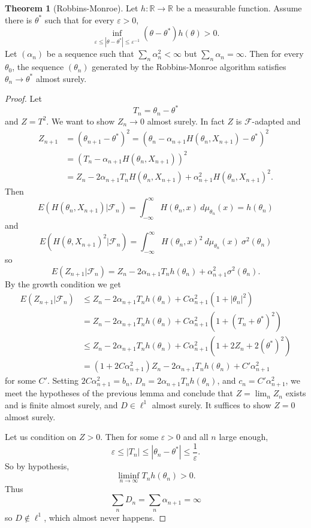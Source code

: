 \documentclass[12pt]{book}
\newcommand{\RR}{\mathbb{R}}
\theoremstyle{definition}
\newtheorem{theorem}{Theorem}[chapter]
\begin{document}
\begin{theorem}[Robbins-Monroe]
Let $h: \RR \to \RR$ be a measurable function.
Assume there is $\theta^*$ such that for every $\varepsilon > 0$,
$$\inf_{\varepsilon \leq |\theta - \theta^*| \leq \varepsilon^{-1}} (\theta - \theta^*)h(\theta) > 0.$$
Let $(\alpha_n)$ be a sequence such that $\sum_n \alpha_n^2 < \infty$ but $\sum_n \alpha_n = \infty$.
Then for every $\theta_0$, the sequence $(\theta_n)$ generated by the Robbins-Monroe algorithm satisfies $\theta_n \to \theta^*$ almost surely.
\end{theorem}
\begin{proof}
Let
$$T_n = \theta_n - \theta^*$$
and $Z = T^2$. We want to show $Z_n \to 0$ almost surely.
In fact $Z$ is $\mathcal F$-adapted and
\begin{align*}
Z_{n+1} &= (\theta_{n+1} - \theta^*)^2 = (\theta_n - \alpha_{n+1}H(\theta_n, X_{n+1}) - \theta^*)^2 \\
&= (T_n - \alpha_{n+1} H(\theta_n, X_{n+1}))^2\\
&= Z_n - 2\alpha_{n+1} T_n H(\theta_n, X_{n+1}) + \alpha_{n+1}^2 H(\theta_n, X_{n+1})^2.
\end{align*}
Then
$$E(H(\theta_n, X_{n+1})|\mathcal F_n) = \int_{-\infty}^\infty H(\theta_n, x) ~d\mu_{\theta_n}(x) = h(\theta_n)$$
and
$$E(H(\theta, X_{n+1})^2|\mathcal F_n) = \int_{-\infty}^\infty H(\theta_n, x)^2 ~d\mu_{\theta_n}(x) ~\sigma^2(\theta_n)$$
so
$$E(Z_{n+1}|\mathcal F_n) = Z_n - 2\alpha_{n+1} T_n h(\theta_n) + \alpha_{n+1}^2 \sigma^2(\theta_n).$$
By the growth condition we get
\begin{align*}
E(Z_{n+1}|\mathcal F_n) &\leq Z_n - 2\alpha_{n+1} T_n h(\theta_n) + C\alpha_{n+1}^2 (1 + |\theta_n|^2)\\
&= Z_n - 2\alpha_{n+1} T_n h(\theta_n) + C\alpha_{n+1}^2(1 + (T_n + \theta^*)^2)\\
&\leq Z_n - 2\alpha_{n+1} T_n h(\theta_n) + C\alpha_{n+1}^2(1 + 2Z_n + 2(\theta^*)^2)\\
&= (1 + 2C\alpha_{n+1}^2) Z_n - 2\alpha_{n+1} T_n h(\theta_n) + C'\alpha_{n+1}^2
\end{align*}
for some $C'$.
Setting $2C\alpha_{n+1}^2 = b_n$, $D_n = 2\alpha_{n+1}T_n h(\theta_n)$, and $c_n = C'\alpha_{n+1}^2$, we meet the hypotheses of the previous lemma and conclude that $Z = \lim_n Z_n$ exists and is finite almost surely, and $D \in \ell^1$ almost surely.
It suffices to show $Z = 0$ almost surely.

Let us condition on $Z > 0$. Then for some $\varepsilon > 0$ and all $n$ large enough,
$$\varepsilon \leq |T_n| \leq |\theta_n - \theta^*| \leq \frac{1}{\varepsilon}.$$
So by hypothesis,
$$\liminf_{n \to \infty} T_n h(\theta_n) > 0.$$
Thus
$$\sum_n D_n = \sum_n \alpha_{n+1} = \infty$$
so $D \notin \ell^1$, which almost never happens.
\end{proof}
\end{document}
